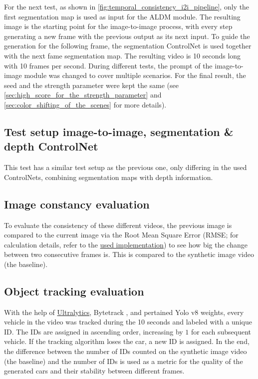 For the next test, as shown in \autoref{fig:temporal_consistency_i2i_pipeline}, only the first segmentation map is used as input for the ALDM module. The resulting image is the starting point for the image-to-image process, with every step generating a new frame with the previous output as its next input. To guide the generation for the following frame, the segmentation ControlNet is used together with the next fame segmentation map. The resulting video is 10 seconds long with 10 frames per second. During different tests, the prompt of the image-to-image module was changed to cover multiple scenarios. For the final result, the seed and the strength parameter were kept the same (see \autoref{sec:high_score_for_the_strength_parameter} and \autoref{sec:color_shifting_of_the_scenes} for more details).

\subsection{Test setup image-to-image, segmentation \& depth ControlNet}

This test has a similar test setup as the previous one, only differing in the used ControlNets, combining segmentation maps with depth information. 

\subsection{Image constancy evaluation}

To evaluate the consistency of these different videos, the previous image is compared to the current image via the Root Mean Square Error (RMSE; for calculation details, refer to the \href{https://github.com/up42/image-similarity-measures/blob/master/image_similarity_measures/quality_metrics.py}{used implementation}) to see how big the change between two consecutive frames is. This is compared to the synthetic image video (the baseline).


\subsection{Object tracking evaluation}

With the help of \href{https://github.com/ultralytics}{Ultralytics}, Bytetrack \cite{zhang2022bytetrackmultiobjecttrackingassociating}, and pertained Yolo v8 \cite{reis2024realtimeflyingobjectdetection} weights, every vehicle in the video was tracked during the 10 seconds and labeled with a unique ID. The IDs are assigned in ascending order, increasing by $1$ for each subsequent vehicle. If the tracking algorithm loses the car, a new ID is assigned. In the end, the difference between the number of IDs counted on the synthetic image video (the baseline) and the number of IDs is used as a metric for the quality of the generated cars and their stability between different frames.